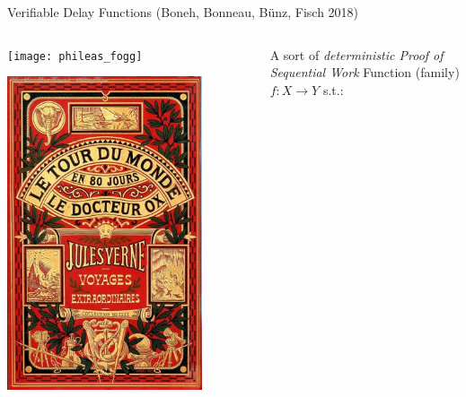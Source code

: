 \documentclass[aspectratio=169]{beamer}
\begin{document}

\begin{frame}{Verifiable Delay Functions (Boneh, Bonneau, Bünz, Fisch 2018)}
  \begin{columns}
    \begin{column}{0.2\textwidth}
      \centering
      \texttt{[image: phileas\_fogg]}

      \vfill

      \includegraphics[width=0.8\textwidth]{80jours-couverture}
    \end{column}
    \begin{column}{0.75\textwidth}
      \begin{block}{A sort of \textit{deterministic Proof of Sequential Work}}
        Function (family) \emph{$f:X\to Y$} s.t.:


\end{block}
\end{column}
\end{columns}
\end{frame}
\end{document}

